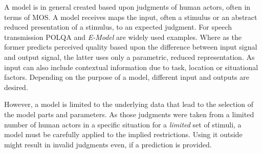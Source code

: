A model is in general created based upon judgments of human actors, often in terms of \ac{MOS}.
A model receives maps the input, often a stimulus or an abstract reduced presentation of a stimulus, to an expected judgment.
For speech transmission \ac{POLQA} \citep{itu-t_p.863:_2014} and \emph{E-Model} \citep{itu-t_g.107:_2014} are widely used examples.
Where as the former predicts perceived quality based upon the difference between input signal and output signal, the latter uses only a parametric, reduced representation.
As input can also include contextual information due to task, location or situational factors.
Depending on the purpose of a model, different input and outputs are desired.

However, a model is limited to the underlying data that lead to the selection of the model parts and parameters.
As those judgments were taken from a limited number of human actors in a specific situation for a \emph{limited} set of stimuli, a model must be carefully applied to the implied restrictions.
Using it outside might result in invalid judgments even, if a prediction is provided.